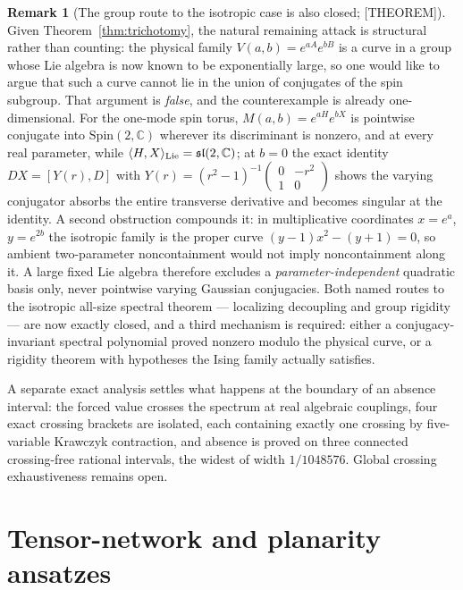 \documentclass[11pt]{article}
\theoremstyle{definition}
\newtheorem{remark}[theorem]{Remark}
\newcommand{\Cb}{\mathbb{C}}
\begin{document}
\begin{remark}[The group route to the isotropic case is also closed; {[THEOREM]}]
Given Theorem~\ref{thm:trichotomy}, the natural remaining attack is structural rather than
counting: the physical family $V(a,b)=e^{aA}e^{bB}$ is a curve in a group whose Lie algebra is now
known to be exponentially large, so one would like to argue that such a curve cannot lie in the union
of conjugates of the spin subgroup. That argument is \emph{false}, and the counterexample is already
one-dimensional. For the one-mode spin torus, $M(a,b)=e^{aH}e^{bX}$ is pointwise conjugate into
$\mathrm{Spin}(2,\Cb)$ wherever its discriminant is nonzero, and at every real parameter, while
$\langle H,X\rangle_{\rm Lie}=\mathfrak{sl}(2,\Cb)$; at $b=0$ the exact identity $DX=[Y(r),D]$ with
$Y(r)=(r^2-1)^{-1}\left(\begin{smallmatrix}0&-r^2\\1&0\end{smallmatrix}\right)$ shows the
varying conjugator absorbs the entire transverse derivative and becomes singular at the identity. A
second obstruction compounds it: in multiplicative coordinates $x=e^{a}$, $y=e^{2b}$ the isotropic
family is the proper curve $(y-1)x^2-(y+1)=0$, so ambient two-parameter noncontainment would not
imply noncontainment along it. A large fixed Lie algebra therefore excludes a
\emph{parameter-independent} quadratic basis only, never pointwise varying Gaussian conjugacies. Both
named routes to the isotropic all-size spectral theorem --- localizing decoupling and group rigidity
--- are now exactly closed, and a third mechanism is required: either a conjugacy-invariant spectral
polynomial proved nonzero modulo the physical curve, or a rigidity theorem with hypotheses the Ising
family actually satisfies.
\end{remark}

A separate exact analysis settles what happens at the boundary of an absence interval: the forced
value crosses the spectrum at real algebraic couplings, four exact crossing brackets are isolated,
each containing exactly one crossing by five-variable Krawczyk contraction, and absence is proved on
three connected crossing-free rational intervals, the widest of width $1/1048576$. Global crossing
exhaustiveness remains open.

\section{Tensor-network and planarity ansatzes}
\end{document}
